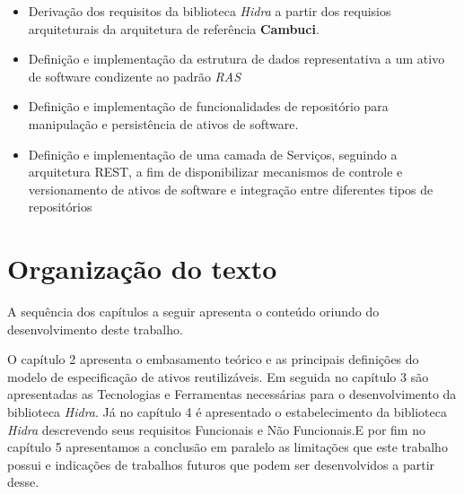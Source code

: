 \begin{itemize}

\item Derivação dos requisitos da biblioteca \textit{Hidra} a partir dos requisios arquiteturais da arquitetura de referência  \textbf{Cambuci}\cite{dissertacaoOsshiro2014}.

\item Definição e implementação da estrutura de dados representativa a um ativo de software condizente ao padrão \textit{RAS} 

\item Definição e implementação de funcionalidades de repositório para manipulação e persistência de ativos de software.

\item Definição e implementação de uma camada de Serviços, seguindo a arquitetura REST, a fim de disponibilizar mecanismos de controle e versionamento de ativos de software e integração entre diferentes tipos de repositórios 

\end{itemize}


\section{Organização do texto} \label{section:sec1}

A sequência dos capítulos a seguir apresenta o conteúdo oriundo do desenvolvimento deste trabalho.

O capítulo 2 apresenta o embasamento teórico e as principais definições do modelo de especificação de ativos reutilizáveis. Em seguida no capítulo 3 são apresentadas as Tecnologias e Ferramentas necessárias para o desenvolvimento da biblioteca \textit{Hidra}. Já no capítulo 4 é apresentado o estabelecimento da biblioteca \textit{Hidra} descrevendo seus requisitos Funcionais e Não Funcionais.E por fim no capítulo 5 apresentamos a conclusão em paralelo as limitações que este trabalho possui e indicações de trabalhos futuros que podem ser desenvolvidos a partir desse. 